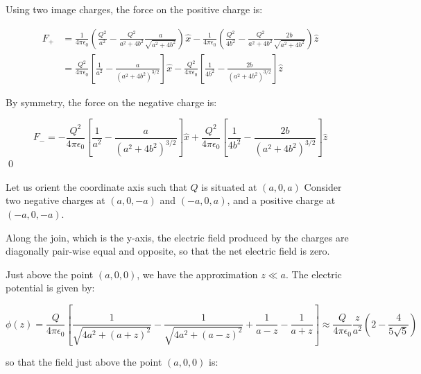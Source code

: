 \documentclass[12pt]{article}
\begin{document}
Using two image charges, the force on the positive charge is:

\begin{equation}
\begin{split}
    F_{+} &= \frac{1}{4\pi \epsilon_{0}} \left( \frac{Q^{2}}{a^{2}} - \frac{Q^{2}}{a^{2} + 4b^{2}} \frac{a}{\sqrt{a^{2} + 4b^{2}}} \right) \hat{x} - \frac{1}{4\pi \epsilon_{0}} \left( \frac{Q^{2}}{4b^{2}} - \frac{Q^{2}}{a^{2} + 4b^{2}} \frac{2b}{\sqrt{a^{2} + 4b^{2}}} \right) \hat{z} \\
    &= \frac{Q^{2}}{4\pi \epsilon_{0}} \left[ \frac{1}{a^{2}} - \frac{a}{(a^{2} + 4b^{2})^{3/2}} \right] \hat{x} - \frac{Q^{2}}{4\pi \epsilon_{0}} \left[ \frac{1}{4b^{2}} - \frac{2b}{(a^{2} + 4b^{2})^{3/2}} \right] \hat{z}
\end{split}
\end{equation}

By symmetry, the force on the negative charge is:

\begin{equation}
    F_{-} = -\frac{Q^{2}}{4\pi \epsilon_{0}} \left[ \frac{1}{a^{2}} - \frac{a}{(a^{2} + 4b^{2})^{3/2}} \right] \hat{x} + \frac{Q^{2}}{4\pi \epsilon_{0}} \left[ \frac{1}{4b^{2}} - \frac{2b}{(a^{2} + 4b^{2})^{3/2}} \right] \hat{z}
\end{equation}
\qed


Let us orient the coordinate axis such that $Q$ is situated at $(a, 0, a)$ Consider two negative charges at $(a, 0, -a)$ and $(-a, 0, a)$, and a positive charge at $(-a, 0, -a)$.

Along the join, which is the y-axis, the electric field produced by the charges are diagonally pair-wise equal and opposite, so that the net electric field is zero.

Just above the point $(a, 0, 0)$, we have the approximation $z \ll a$. The electric potential is given by:

\begin{equation}
    \phi(z) = \frac{Q}{4\pi \epsilon_{0}} \left[ \frac{1}{\sqrt{4a^{2} + (a+z)^{2}}} - \frac{1}{\sqrt{4a^{2} + (a-z)^{2}}} + \frac{1}{a-z} - \frac{1}{a+z} \right] \approx \frac{Q}{4\pi \epsilon_{0}} \frac{z}{a^{2}} \left( 2 - \frac{4}{5\sqrt{5}} \right)
\end{equation}

so that the field just above the point $(a, 0, 0)$ is:
\end{document}
